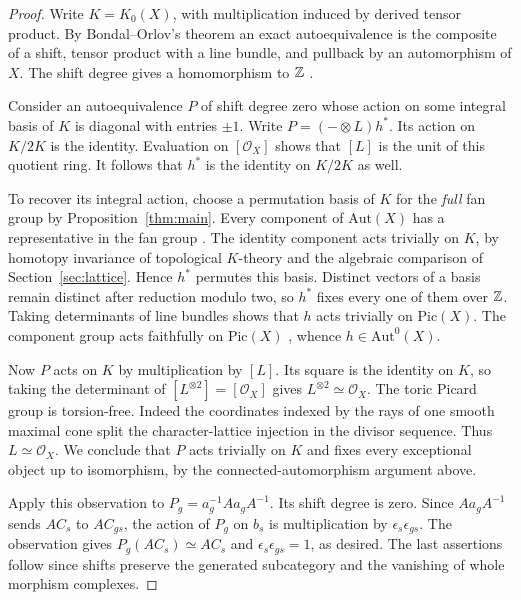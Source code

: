 \begin{proof}
Write $K=K_0(X)$, with multiplication induced by derived tensor product. By Bondal--Orlov's theorem an exact autoequivalence is the composite of a shift, tensor product with a line bundle, and pullback by an automorphism of $X$. The shift degree gives a homomorphism to $\mathbb Z$ \cite[Theorem~3.1]{BO}.

Consider an autoequivalence $P$ of shift degree zero whose action on some integral basis of $K$ is diagonal with entries $\pm1$. Write $P=(-\otimes L)h^*$. Its action on $K/2K$ is the identity. Evaluation on $[\mathcal O_X]$ shows that $[L]$ is the unit of this quotient ring. It follows that $h^*$ is the identity on $K/2K$ as well.

To recover its integral action, choose a permutation basis of $K$ for the \emph{full} fan group by Proposition~\ref{thm:main}. Every component of $\mathrm{Aut}(X)$ has a representative in the fan group \cite[Theorem~4.5]{Dun}. The identity component acts trivially on $K$, by homotopy invariance of topological $K$-theory and the algebraic comparison of Section~\ref{sec:lattice}. Hence $h^*$ permutes this basis. Distinct vectors of a basis remain distinct after reduction modulo two, so $h^*$ fixes every one of them over $\mathbb Z$. Taking determinants of line bundles shows that $h$ acts trivially on $\mathrm{Pic}(X)$. The component group acts faithfully on $\mathrm{Pic}(X)$ \cite[Theorem~4.5]{Dun}, whence $h\in\mathrm{Aut}^0(X)$.

Now $P$ acts on $K$ by multiplication by $[L]$. Its square is the identity on $K$, so taking the determinant of $[L^{\otimes2}]=[\mathcal O_X]$ gives $L^{\otimes2}\simeq\mathcal O_X$. The toric Picard group is torsion-free. Indeed the coordinates indexed by the rays of one smooth maximal cone split the character-lattice injection in the divisor sequence. Thus $L\simeq\mathcal O_X$. We conclude that $P$ acts trivially on $K$ and fixes every exceptional object up to isomorphism, by the connected-automorphism argument above.

Apply this observation to $P_g=a_g^{-1} A a_g A^{-1}$. Its shift degree is zero. Since $A a_g A^{-1}$ sends $A C_s$ to $A C_{gs}$, the action of $P_g$ on $b_s$ is multiplication by $\epsilon_s\epsilon_{gs}$. The observation gives $P_g(A C_s)\simeq A C_s$ and $\epsilon_s\epsilon_{gs}=1$, as desired. The last assertions follow since shifts preserve the generated subcategory and the vanishing of whole morphism complexes.
\end{proof}

